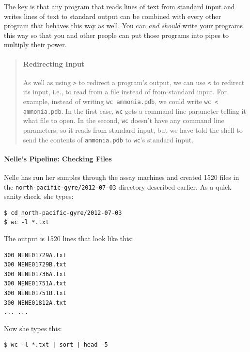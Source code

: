 \documentclass[]{book}
\begin{document}
The key is that any program that reads lines of text from standard input
and writes lines of text to standard output can be combined with every
other program that behaves this way as well. You can \emph{and should}
write your programs this way so that you and other people can put those
programs into pipes to multiply their power.

\begin{quote}
\mbox{}\paragraph{Redirecting Input}

As well as using \texttt{\textgreater{}} to redirect a program's output,
we can use \texttt{\textless{}} to redirect its input, i.e., to read
from a file instead of from standard input. For example, instead of
writing \texttt{wc ammonia.pdb}, we could write
\texttt{wc \textless{} ammonia.pdb}. In the first case, \texttt{wc} gets
a command line parameter telling it what file to open. In the second,
\texttt{wc} doesn't have any command line parameters, so it reads from
standard input, but we have told the shell to send the contents of
\texttt{ammonia.pdb} to \texttt{wc}'s standard input.
\end{quote}

\mbox{}\paragraph{Nelle's Pipeline: Checking Files}

Nelle has run her samples through the assay machines and created 1520
files in the \texttt{north-pacific-gyre/2012-07-03} directory described
earlier. As a quick sanity check, she types:

\begin{verbatim}
$ cd north-pacific-gyre/2012-07-03
$ wc -l *.txt
\end{verbatim}

The output is 1520 lines that look like this:

\begin{verbatim}
300 NENE01729A.txt
300 NENE01729B.txt
300 NENE01736A.txt
300 NENE01751A.txt
300 NENE01751B.txt
300 NENE01812A.txt
... ...
\end{verbatim}

Now she types this:

\begin{verbatim}
$ wc -l *.txt | sort | head -5
\end{verbatim}
\end{document}
